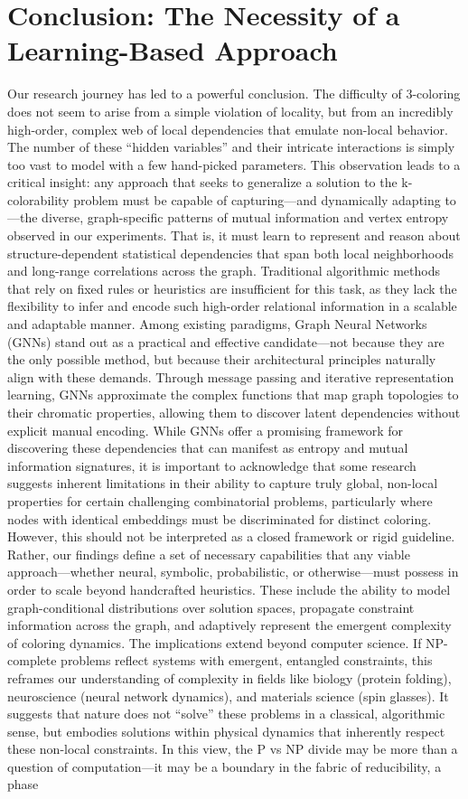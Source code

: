 \documentclass[12pt, letterpaper]{article}
\begin{document}
\section{Conclusion: The Necessity of a Learning-Based Approach}
Our research journey has led to a powerful conclusion. The difficulty of 3-coloring does not seem to arise from a simple violation of locality, but from an incredibly high-order, complex web of local dependencies that emulate non-local behavior. The number of these ``hidden variables'' and their intricate interactions is simply too vast to model with a few hand-picked parameters. This observation leads to a critical insight: any approach that seeks to generalize a solution to the k-colorability problem must be capable of capturing—and dynamically adapting to—the diverse, graph-specific patterns of mutual information and vertex entropy observed in our experiments. That is, it must learn to represent and reason about structure-dependent statistical dependencies that span both local neighborhoods and long-range correlations across the graph. Traditional algorithmic methods that rely on fixed rules or heuristics are insufficient for this task, as they lack the flexibility to infer and encode such high-order relational information in a scalable and adaptable manner. Among existing paradigms, Graph Neural Networks (GNNs) stand out as a practical and effective candidate—not because they are the only possible method, but because their architectural principles naturally align with these demands. Through message passing and iterative representation learning, GNNs approximate the complex functions that map graph topologies to their chromatic properties, allowing them to discover latent dependencies without explicit manual encoding. While GNNs offer a promising framework for discovering these dependencies that can manifest as entropy and mutual information signatures, it is important to acknowledge that some research suggests inherent limitations in their ability to capture truly global, non-local properties for certain challenging combinatorial problems, particularly where nodes with identical embeddings must be discriminated for distinct coloring. However, this should not be interpreted as a closed framework or rigid guideline. Rather, our findings define a set of necessary capabilities that any viable approach—whether neural, symbolic, probabilistic, or otherwise—must possess in order to scale beyond handcrafted heuristics. These include the ability to model graph-conditional distributions over solution spaces, propagate constraint information across the graph, and adaptively represent the emergent complexity of coloring dynamics. The implications extend beyond computer science. If NP-complete problems reflect systems with emergent, entangled constraints, this reframes our understanding of complexity in fields like biology (protein folding), neuroscience (neural network dynamics), and materials science (spin glasses). It suggests that nature does not ``solve'' these problems in a classical, algorithmic sense, but embodies solutions within physical dynamics that inherently respect these non-local constraints. In this view, the P vs NP divide may be more than a question of computation—it may be a boundary in the fabric of reducibility, a phase 
\end{document}
